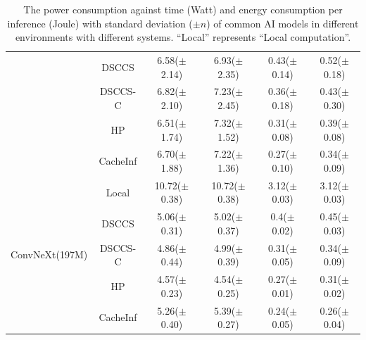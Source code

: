 \begin{table}[htb]
\begin{tabular}{cc|c|c|c|c}
& DSCCS & 6.58($\pm$2.14) & 6.93($\pm$2.35) & 0.43($\pm$0.14) & 0.52($\pm$0.18) \\
 & DSCCS-C & 6.82($\pm$2.10) & 7.23($\pm$2.45) & 0.36($\pm$0.18) & 0.43($\pm$0.30) \\
 & HP & 6.51($\pm$1.74) & 7.32($\pm$1.52) & 0.31($\pm$0.08) & 0.39($\pm$0.08) \\
 & CacheInf & 6.70($\pm$1.88) & 7.22($\pm$1.36) & 0.27($\pm$0.10) & 0.34($\pm$0.09) \\
\cline{1-6}
\multirow[c]{5}{*}{ConvNeXt(197M)} & Local & 10.72($\pm$0.38) & 10.72($\pm$0.38) & 3.12($\pm$0.03) & 3.12($\pm$0.03) \\
& DSCCS & 5.06($\pm$0.31) & 5.02($\pm$0.37) & 0.4($\pm$0.02) & 0.45($\pm$0.03) \\
 & DSCCS-C & 4.86($\pm$0.44) & 4.99($\pm$0.39) & 0.31($\pm$0.05) & 0.34($\pm$0.09) \\
 & HP & 4.57($\pm$0.23) & 4.54($\pm$0.25) & 0.27($\pm$0.01) & 0.31($\pm$0.02) \\
 & CacheInf & 5.26($\pm$0.40) & 5.39($\pm$0.27) & 0.24($\pm$0.05) & 0.26($\pm$0.04) \\
\cline{1-6}
\bottomrule
\end{tabular}
    \caption{The power consumption against time (Watt) and energy consumption per inference (Joule) with standard deviation ($\pm n$) of common AI models in different environments with different systems. ``Local'' represents ``Local computation''.}
    \label{tab:torchvision_power}
\end{table}